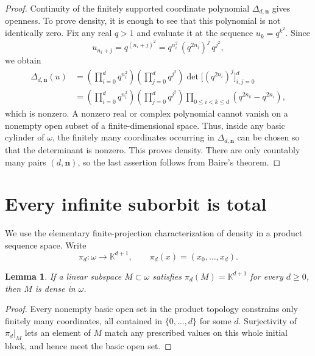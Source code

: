 \documentclass[11pt]{article}
\newtheorem{lemma}[theorem]{Lemma}
\newcommand{\K}{\mathbb K}
\begin{document}
\begin{proof}
Continuity of the finitely supported coordinate polynomial $\Delta_{d,\mathbf
n}$ gives openness.  To prove density, it is enough to see that this
polynomial is not identically zero.  Fix any real $q>1$ and evaluate it at
the sequence $u_k=q^{k^2}$.  Since
\[
 u_{n_i+j}
 =q^{(n_i+j)^2}
 =q^{n_i^2}\,(q^{2n_i})^j\,q^{j^2},
\]
we obtain
\begin{align*}
 \Delta_{d,\mathbf n}(u)
 &=\left(\prod_{i=0}^d q^{n_i^2}\right)
   \left(\prod_{j=0}^d q^{j^2}\right)
   \det\bigl[(q^{2n_i})^j\bigr]_{i,j=0}^d\\
 &=\left(\prod_{i=0}^d q^{n_i^2}\right)
   \left(\prod_{j=0}^d q^{j^2}\right)
   \prod_{0\leq i<k\leq d}(q^{2n_k}-q^{2n_i}),
\end{align*}
which is nonzero.  A nonzero real or complex polynomial cannot vanish on a
nonempty open subset of a finite-dimensional space.  Thus, inside any basic
cylinder of $\omega$, the finitely many coordinates occurring in
$\Delta_{d,\mathbf n}$ can be chosen so that the determinant is nonzero.
This proves density.  There are only countably many pairs
$(d,\mathbf n)$, so the last assertion follows from Baire's theorem.
\end{proof}

\section{Every infinite suborbit is total}

We use the elementary finite-projection characterization of density in a
product sequence space.  Write
\[
 \pi_d\colon\omega\longrightarrow\K^{d+1},\qquad
 \pi_d(x)=(x_0,\ldots,x_d).
\]

\begin{lemma}\label{lem:projection}
If a linear subspace $M\subset\omega$ satisfies
$\pi_d(M)=\K^{d+1}$ for every $d\geq0$, then $M$ is dense in $\omega$.
\end{lemma}

\begin{proof}
Every nonempty basic open set in the product topology constrains only
finitely many coordinates, all contained in $\{0,\ldots,d\}$ for some $d$.
Surjectivity of $\pi_d|_M$ lets an element of $M$ match any prescribed values
on this whole initial block, and hence meet the basic open set.
\end{proof}
\end{document}
